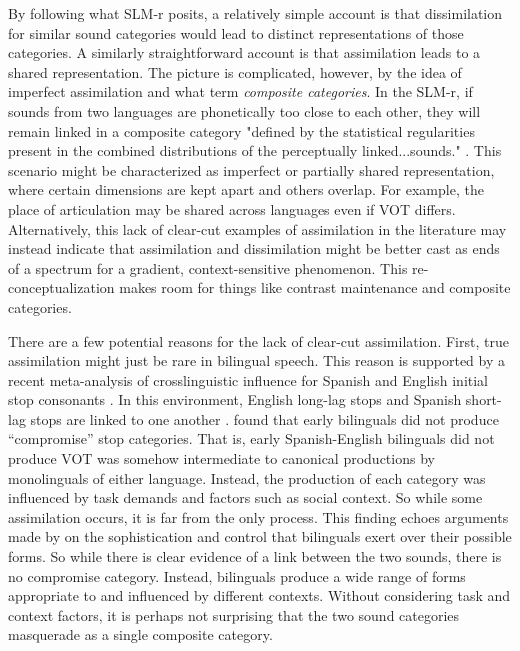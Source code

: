 By following what SLM-r posits, a relatively simple account is that dissimilation for similar sound categories would lead to distinct representations of those categories. A similarly straightforward account is that assimilation leads to a shared representation. The picture is complicated, however, by the idea of imperfect assimilation and what \citeauthor{flege_2021_slmr} term \textit{composite categories}. In the SLM-r, if sounds from two languages are phonetically too close to each other, they will remain linked in a composite category "defined by the statistical regularities present in the combined distributions of the perceptually linked...sounds." \citep[][p. 41]{flege_2021_slmr}. This scenario might be characterized as imperfect or partially shared representation, where certain dimensions are kept apart and others overlap. For example, the place of articulation may be shared across languages even if VOT differs. Alternatively, this lack of clear-cut examples of assimilation in the literature may instead indicate that assimilation and dissimilation might be better cast as ends of a spectrum for a gradient, context-sensitive phenomenon. This re-conceptualization makes room for things like contrast maintenance and composite categories.

There are a few potential reasons for the lack of clear-cut assimilation. First, true assimilation might just be rare in bilingual speech. This reason is supported by a recent meta-analysis of crosslinguistic influence for Spanish and English initial stop consonants \citep{casillas_2021_interlingual}. In this environment, English long-lag stops and Spanish short-lag stops are linked to one another \citep{fricke_2016_phonetic, goldrick_2014_switching, bullock_2009_sociophonetics, olson_2016_transfer}. \citeauthor{casillas_2021_interlingual} found that early bilinguals did not produce ``compromise'' stop categories. That is, early Spanish-English bilinguals did not produce VOT was somehow intermediate to canonical productions by monolinguals of either language. Instead, the production of each category was influenced by task demands and factors such as social context. So while some assimilation occurs, it is far from the only process. This finding echoes arguments made by \citet{bullock_2009_sociophonetics} on the sophistication and control that bilinguals exert over their possible forms. So while there is clear evidence of a link between the two sounds, there is no compromise category. Instead, bilinguals produce a wide range of forms appropriate to and influenced by different contexts. Without considering task and context factors, it is perhaps not surprising that the two sound categories masquerade as a single composite category. 

